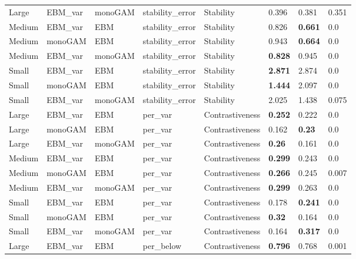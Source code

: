 \begin{table}[]
{\begin{tabular}{@{}llllllll@{}}
Large  & EBM\_var & monoGAM & stability\_error  & Stability          & 0.396          & 0.381          & 0.351 \\
Medium & EBM\_var & EBM     & stability\_error  & Stability          & 0.826          & \textbf{0.661} & 0.0   \\
Medium & monoGAM        & EBM     & stability\_error  & Stability          & 0.943          & \textbf{0.664} & 0.0   \\
Medium & EBM\_var & monoGAM & stability\_error  & Stability          & \textbf{0.828} & 0.945          & 0.0   \\
Small  & EBM\_var & EBM     & stability\_error  & Stability          & \textbf{2.871} & 2.874          & 0.0   \\
Small  & monoGAM        & EBM     & stability\_error  & Stability          & \textbf{1.444} & 2.097          & 0.0   \\
Small  & EBM\_var & monoGAM & stability\_error  & Stability          & 2.025          & 1.438          & 0.075 \\
Large  & EBM\_var & EBM     & per\_var          & Contrastiveness    & \textbf{0.252} & 0.222          & 0.0   \\
Large  & monoGAM        & EBM     & per\_var          & Contrastiveness    & 0.162          & \textbf{0.23}  & 0.0   \\
Large  & EBM\_var & monoGAM & per\_var          & Contrastiveness    & \textbf{0.26}  & 0.161          & 0.0   \\
Medium & EBM\_var & EBM     & per\_var          & Contrastiveness    & \textbf{0.299} & 0.243          & 0.0   \\
Medium & monoGAM        & EBM     & per\_var          & Contrastiveness    & \textbf{0.266} & 0.245          & 0.007 \\
Medium & EBM\_var & monoGAM & per\_var          & Contrastiveness    & \textbf{0.299} & 0.263          & 0.0   \\
Small  & EBM\_var & EBM     & per\_var          & Contrastiveness    & 0.178          & \textbf{0.241} & 0.0   \\
Small  & monoGAM        & EBM     & per\_var          & Contrastiveness    & \textbf{0.32}  & 0.164          & 0.0   \\
Small  & EBM\_var & monoGAM & per\_var          & Contrastiveness    & 0.164          & \textbf{0.317} & 0.0   \\
Large  & EBM\_var & EBM     & per\_below        & Contrastiveness    & \textbf{0.796} & 0.768          & 0.001 \\

\end{tabular}}
\end{table}
